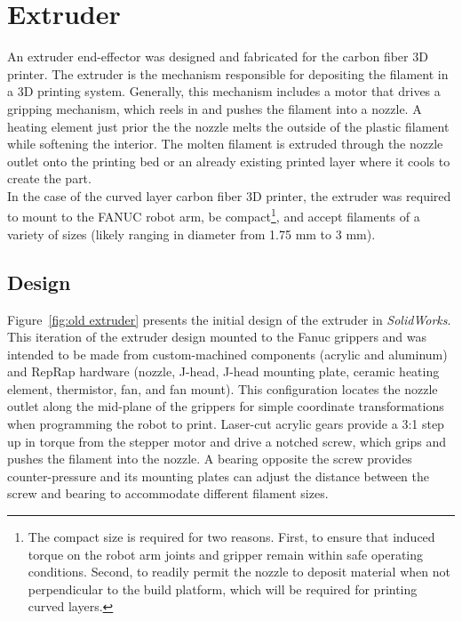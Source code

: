 \section{Extruder}

An extruder end-effector was designed and fabricated for the carbon fiber 3D printer. The extruder is the mechanism responsible for depositing the filament in a 3D printing system. Generally, this mechanism includes a motor that drives a gripping mechanism, which reels in and pushes the filament into a nozzle. A heating element just prior the the nozzle melts the outside of the plastic filament while softening the interior. The molten filament is extruded through the nozzle outlet onto the printing bed or an already existing printed layer where it cools to create the part.\\

In the case of the curved layer carbon fiber 3D printer, the extruder was required to mount to the FANUC robot arm, be compact\footnote{The compact size is required for two reasons. First, to ensure that induced torque on the robot arm joints and gripper remain within safe operating conditions. Second, to readily permit the nozzle to deposit material when not perpendicular to the build platform, which will be required for printing curved layers.}, and accept filaments of a variety of sizes (likely ranging in diameter from 1.75 mm to 3 mm). \\

\subsection{Design}

\indent

Figure~\ref{fig:old extruder} presents the initial design of the extruder in \emph{SolidWorks}. This iteration of the extruder design mounted to the Fanuc grippers and was intended to be made from custom-machined components (acrylic and aluminum) and RepRap hardware (nozzle, J-head, J-head mounting plate, ceramic heating element, thermistor, fan, and fan mount). This configuration locates the nozzle outlet along the mid-plane of the grippers for simple coordinate transformations when programming the robot to print. Laser-cut acrylic gears provide a 3:1 step up in torque from the stepper motor and drive a notched screw, which grips and pushes the filament into the nozzle. A bearing opposite the screw provides counter-pressure and its mounting plates can adjust the distance between the screw and bearing to accommodate different filament sizes.\\

